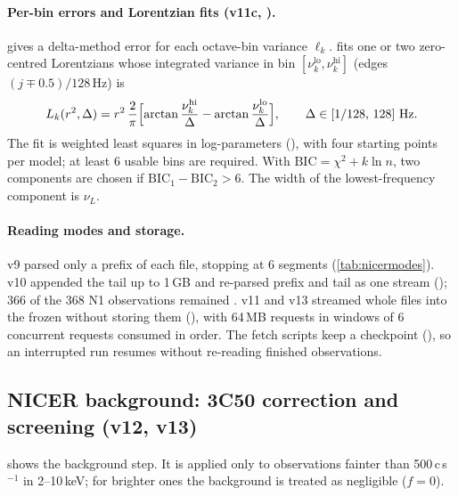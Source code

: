 \paragraph{Per-bin errors and Lorentzian fits (v11c, ).}\label{sec:lorentz}  gives a delta-method
error for each octave-bin variance $\ell_k$.  fits one or two zero-centred Lorentzians whose integrated
variance in bin $[\nu^\mathrm{lo}_k,\nu^\mathrm{hi}_k]$ (edges $(j\mp0.5)/128$\,Hz) is
\begin{equation}
L_k(r^2,\Delta)=r^2\,\frac{2}{\pi}\Bigl[\arctan\frac{\nu^\mathrm{hi}_k}{\Delta}-\arctan\frac{\nu^\mathrm{lo}_k}{\Delta}\Bigr],\qquad\Delta\in[1/128,\,128]\ \mathrm{Hz}.\label{eq:lorentz}
\end{equation}
The fit is weighted least squares in log-parameters (), with four starting points per
model; at least 6 usable bins are required. With $\mathrm{BIC}=\chi^2+k\ln n$, two components are chosen if
$\mathrm{BIC}_1-\mathrm{BIC}_2>6$. The width of the lowest-frequency component is $\nu_L$.

\paragraph{Reading modes and storage.} v9 parsed only a prefix of each file, stopping at 6 segments (\cref{tab:nicermodes}).
v10 appended the tail up to 1\,GB and re-parsed prefix and tail as one stream (); 366 of the 368 N1
observations remained . v11 and v13 streamed whole files into the frozen  without storing them
(), with 64\,MB requests in windows of 6 concurrent requests consumed in order. The fetch
scripts keep a checkpoint (), so an interrupted run resumes without re-reading finished
observations.

\subsection{NICER background: 3C50 correction and screening (v12, v13)}\label{sec:3c50}
 shows the background step. It is applied only to observations fainter than 500\,c\,s$^{-1}$ in
2--10\,keV; for brighter ones the background is treated as negligible ($f=0$).

